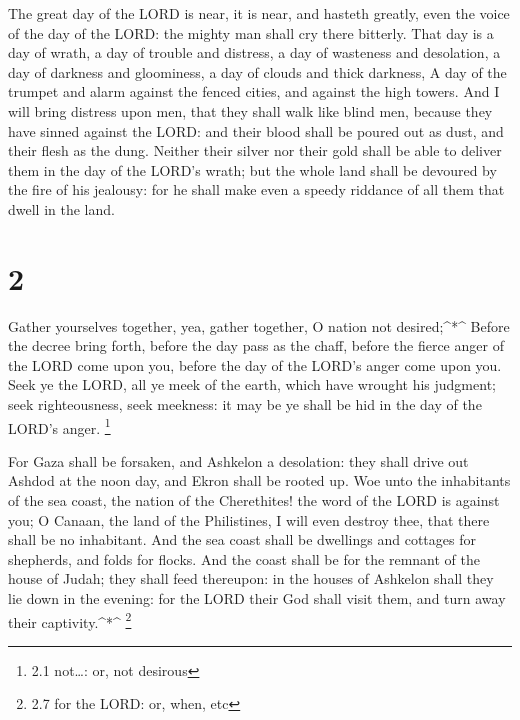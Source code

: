  The great day of the LORD is near, it is near, and hasteth
greatly, even the voice of the day of the LORD: the mighty man shall cry
there bitterly.  That day is a day of wrath, a day of
trouble and distress, a day of wasteness and desolation, a day of
darkness and gloominess, a day of clouds and thick darkness,
 A day of the trumpet and alarm against the fenced cities,
and against the high towers.  And I will bring distress
upon men, that they shall walk like blind men, because they have sinned
against the LORD: and their blood shall be poured out as dust, and their
flesh as the dung.  Neither their silver nor their gold
shall be able to deliver them in the day of the LORD's wrath; but the
whole land shall be devoured by the fire of his jealousy: for he shall
make even a speedy riddance of all them that dwell in the land.

\hypertarget{section-1}{%
\section{2}\label{section-1}}

 Gather yourselves together, yea, gather together, O nation
not desired;\^{}*\^{}  Before the decree bring forth, before
the day pass as the chaff, before the fierce anger of the LORD come upon
you, before the day of the LORD's anger come upon you.  Seek
ye the LORD, all ye meek of the earth, which have wrought his judgment;
seek righteousness, seek meekness: it may be ye shall be hid in the day
of the LORD's anger. \footnote{2.1 not\ldots: or, not desirous}

 For Gaza shall be forsaken, and Ashkelon a desolation: they
shall drive out Ashdod at the noon day, and Ekron shall be rooted up.
 Woe unto the inhabitants of the sea coast, the nation of
the Cherethites! the word of the LORD is against you; O Canaan, the land
of the Philistines, I will even destroy thee, that there shall be no
inhabitant.  And the sea coast shall be dwellings and
cottages for shepherds, and folds for flocks.  And the coast
shall be for the remnant of the house of Judah; they shall feed
thereupon: in the houses of Ashkelon shall they lie down in the evening:
for the LORD their God shall visit them, and turn away their
captivity.\^{}*\^{} \footnote{2.7 for the LORD: or, when, etc}

